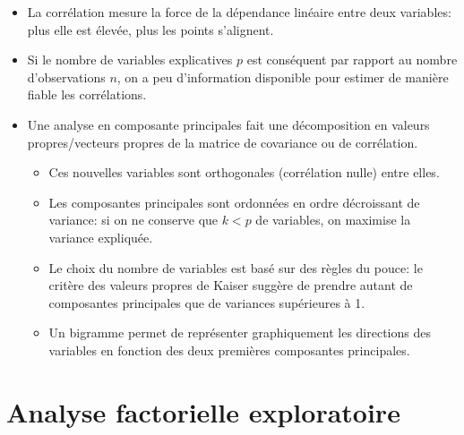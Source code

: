 \documentclass[
  11pt,
  letterpaper,
]{scrbook}
\providecommand{\tightlist}{%
  \setlength{\itemsep}{0pt}\setlength{\parskip}{0pt}}\usepackage{longtable,booktabs,array}
\theoremstyle{definition}
\theoremstyle{remark}
\begin{document}
\begin{tcolorbox}[enhanced jigsaw, coltitle=black, left=2mm, opacitybacktitle=0.6, colback=white, leftrule=.75mm, colframe=quarto-callout-note-color-frame, toprule=.15mm, colbacktitle=quarto-callout-note-color!10!white, opacityback=0, bottomtitle=1mm, toptitle=1mm, rightrule=.15mm, title=\textcolor{quarto-callout-note-color}{\faInfo}\hspace{0.5em}{En résumé}, breakable, titlerule=0mm, arc=.35mm, bottomrule=.15mm]

\begin{itemize}
\tightlist
\item
  La corrélation mesure la force de la dépendance linéaire entre deux
  variables: plus elle est élevée, plus les points s'alignent.
\item
  Si le nombre de variables explicatives \(p\) est conséquent par
  rapport au nombre d'observations \(n\), on a peu d'information
  disponible pour estimer de manière fiable les corrélations.
\item
  Une analyse en composante principales fait une décomposition en
  valeurs propres/vecteurs propres de la matrice de covariance ou de
  corrélation.

  \begin{itemize}
  \tightlist
  \item
    Ces nouvelles variables sont orthogonales (corrélation nulle) entre
    elles.
  \item
    Les composantes principales sont ordonnées en ordre décroissant de
    variance: si on ne conserve que \(k<p\) de variables, on maximise la
    variance expliquée.
  \item
    Le choix du nombre de variables est basé sur des règles du pouce: le
    critère des valeurs propres de Kaiser suggère de prendre autant de
    composantes principales que de variances supérieures à 1.
  \item
    Un bigramme permet de représenter graphiquement les directions des
    variables en fonction des deux premières composantes principales.
  \end{itemize}
\end{itemize}

\end{tcolorbox}

\section{Analyse factorielle
exploratoire}\label{analyse-factorielle-exploratoire-1}
\end{document}
